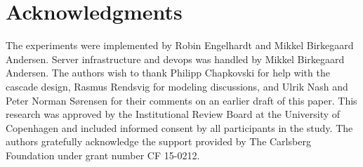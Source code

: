 \documentclass[10pt,a4paper,twocolumn,lineno]{article}
\begin{document}
%
%

\section*{Acknowledgments}The experiments were implemented by Robin Engelhardt and Mikkel Birkegaard Andersen. Server infrastructure and devops was handled by Mikkel Birkegaard Andersen. The authors wish to thank Philipp Chapkovski for help with the cascade design, Rasmus Rendsvig for modeling discussions, and Ulrik Nash and Peter Norman Sørensen for their comments on an earlier draft of this paper. This research was approved by the Institutional Review Board at the University of Copenhagen and included informed consent by all participants in the study. The authors gratefully acknowledge the support provided by The Carlsberg Foundation under grant number CF 15-0212.



\end{document}
